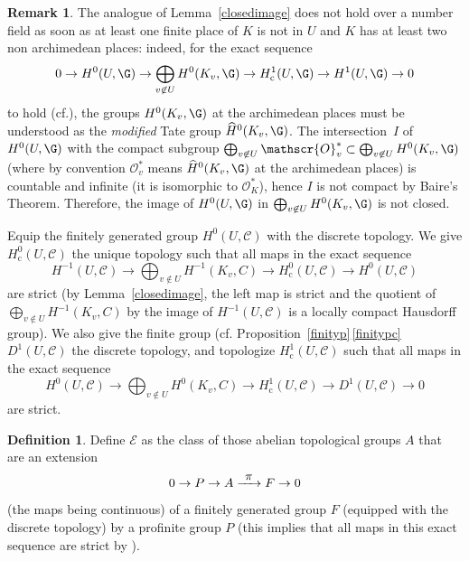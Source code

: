 \documentclass[10pt,a4paper]{amsart}
\newcommand{\cf}{cf.\xspace}
\let\mathcal\mathscr
\newcommand\To[1]{\mathchoice{\xrightarrow{\textstyle\kern4pt#1\kern3pt}}{\stackrel{#1}{\longrightarrow}}{}{}}
\newcommand{\rc}{\mathrm{c}}
\theoremstyle{plain}
\theoremstyle{definition}
\newtheorem{defi}[theo]{Definition}
\newtheorem{rema}[theo]{Remark}
\newcommand\cO {\mathcal{O}}
\newcommand \cC {\mathcal{C}}
\begin{document}
\begin{rema} \label{nocdn}
The analogue of Lemma~\ref{closedimage} does not hold over a number field
as soon as at least one finite place of $K$ is not in $U$ and $K$ has at
least two non archimedean places: indeed, for the exact sequence\vspace*{-3pt}
\[
0 \to H^0(U,\G) \to \bigoplus_{v \not \in U} H^0(K_v,\G) \to
H^1_\rc(U,\G) \to H^1(U,\G) \to 0
\]
to hold (\cf \cite[beginning of \S 2]{DemH}),
the groups $H^0(K_v,\G)$ at the archimedean places
must be understood as the \emph{modified} Tate group ${\widehat H}^0(K_v,\G)$.
The intersection~$I$ of~$H^0(U,\G)$ with
the compact subgroup
$\bigoplus_{v \not \in U} \cO_v^* \subset
\bigoplus_{v \not \in U} H^0(K_v,\G) $ (where by convention $\cO_v^*$
means ${\widehat H}^0(K_v,\G)$ at the archimedean places) is countable
and infinite (it is isomorphic to $\cO_K^*$),
hence $I$ is not compact by Baire's Theorem.
Therefore, the image of $H^0(U,\G)$ in $\bigoplus_{v \not \in U} H^0(K_v,\G)$
is not closed.
\end{rema}

Equip the finitely generated group $H^0(U,\cC)$ with the discrete
topology. We give $H^0_\rc(U, \cC)$ the unique topology such that all maps in
the exact sequence
\begin{equation} \label {toph0c}
H^{-1}(U,\cC)
\to \bigoplus_{v \not \in U} H^{-1}(K_v,C) \to H^0_\rc(U, \cC) \to H^0(U,\cC)
\end{equation}
are strict (by Lemma~\ref{closedimage}, the left map is strict and the
quotient of $\bigoplus_{v \not \in U} H^{-1}(K_v,C)$ by the image of
$H^{-1}(U,\cC)$ is a locally compact Hausdorff group).
We also give the finite group (\cf Proposition~\ref{finityp}\,\eqref{finitypc}
$D^1(U,\cC)$ the discrete topology, and topologize $H^1_\rc(U,\cC)$ such that
all maps in the exact sequence
\begin{equation} \label {toph1c}
H^0(U,\cC) \to \bigoplus_{v \not \in U} H^0(K_v,C) \to H^1_\rc(U, \cC) \to D^1(U,\cC) \to 0
\end{equation}
are strict.

\begin{defi}
Define ${\mathcal E}$ as the class of those abelian topological groups
$A$ that are an extension
\begin{equation} \label{extgroup}
0 \to P \to A \To{\pi}F \to 0
\end{equation}
(the maps being continuous)
of a finitely generated group $F$ (equipped with the
discrete topology) by a profinite group $P$ (this implies that all maps
in this exact sequence are strict by \cite[Lem.\,3.4]{DemH}).
\end{defi}
\end{document}
